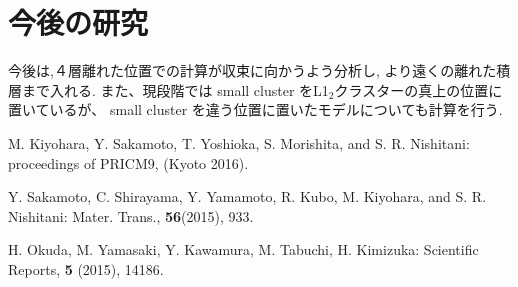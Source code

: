 \documentclass[a4j,twocolumn]{jsarticle}
\begin{document}
\section{今後の研究}
今後は,４層離れた位置での計算が収束に向かうよう分析し, より遠くの離れた積層まで入れる.
また、現段階では small cluster をL1$_2$クラスターの真上の位置に置いているが、 small cluster を違う位置に置いたモデルについても計算を行う.


\begin{thebibliography}{9}
 M. Kiyohara, Y. Sakamoto, T. Yoshioka, S. Morishita, and S. R. Nishitani: proceedings of PRICM9, (Kyoto 2016).

Y. Sakamoto, C. Shirayama, Y. Yamamoto, R. Kubo, M. Kiyohara, and S. R. Nishitani: Mater. Trans., {\bf 56}(2015), 933.

 H. Okuda, M. Yamasaki, Y. Kawamura, M. Tabuchi, H. Kimizuka: Scientific Reports, {\bf5} (2015), 14186.
\end{thebibliography}
\end{document}

